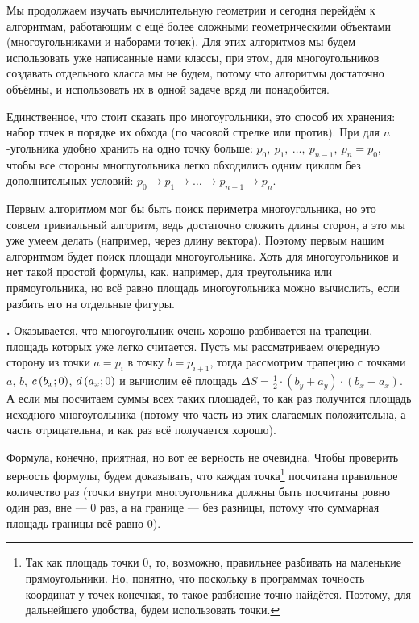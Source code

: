 Мы продолжаем изучать вычислительную геометрии и сегодня перейдём к алгоритмам, работающим с ещё более сложными геометрическими объектами (многоугольниками и наборами точек). Для этих алгоритмов мы будем использовать уже написанные нами классы, при этом, для многоугольников создавать отдельного класса мы не будем, потому что алгоритмы достаточно объёмны, и использовать их в одной задаче вряд ли понадобится.

Единственное, что стоит сказать про многоугольники, это способ их хранения: набор точек в порядке их обхода (по часовой стрелке или против). При для $n$-угольника удобно хранить на одно точку больше: $p_0,\ p_1,\ \ldots,\ p_{n - 1},\ p_n = p_0$, чтобы все стороны многоугольника легко обходились одним циклом без дополнительных условий: $p_0 \to p_1 \to \ldots \to p_{n - 1} \to p_n$.


Первым алгоритмом мог бы быть поиск периметра многоугольника, но это совсем тривиальный алгоритм, ведь достаточно сложить длины сторон, а это мы уже умеем делать (например, через длину вектора). Поэтому первым нашим алгоритмом будет поиск площади многоугольника. Хоть для многоугольников и нет такой простой формулы, как, например, для треугольника или прямоугольника, но всё равно площадь многоугольника можно вычислить, если разбить его на отдельные фигуры.

\textbf{.} Оказывается, что многоугольник очень хорошо разбивается на трапеции, площадь которых уже легко считается. Пусть мы рассматриваем очередную сторону из точки $a = p_i$ в точку $b = p_{i + 1}$, тогда рассмотрим трапецию с точками $a$, $b$, $c\left(b_x;0\right)$, $d\left(a_x;0\right)$ и вычислим её площадь $\Delta S = \frac{1}{2} \cdot (b_y + a_y) \cdot (b_x - a_x)$. А если мы посчитаем суммы всех таких площадей, то как раз получится площадь исходного многоугольника (потому что часть из этих слагаемых положительна, а часть отрицательна, и как раз всё получается хорошо).

Формула, конечно, приятная, но вот ее верность не очевидна. Чтобы проверить верность формулы, будем доказывать, что каждая точка\footnote{Так как площадь точки 0, то, возможно, правильнее разбивать на маленькие прямоугольники. Но, понятно, что поскольку в программах точность координат у точек конечная, то такое разбиение точно найдётся. Поэтому, для дальнейшего удобства, будем использовать точки.} посчитана правильное количество раз (точки внутри многоугольника должны быть посчитаны ровно один раз, вне — 0 раз, а на границе — без разницы, потому что суммарная площадь границы всё равно 0).

